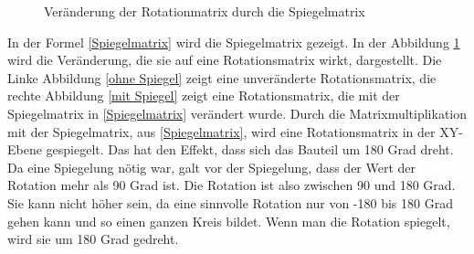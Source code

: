     \begin{figure}[t]
        \centering
            \caption[Veränderung der Rotationmatrix durch die Spiegelmatrix]{Veränderung der Rotationmatrix durch die Spiegelmatrix}
            \label{Veränderung der Rotationmatrix durch die Spiegelmatrix}
    \end{figure}

In der Formel \ref{Spiegelmatrix} wird die Spiegelmatrix gezeigt. In der Abbildung \ref{Veränderung der Rotationmatrix durch die Spiegelmatrix} wird die Veränderung, die sie auf eine Rotationsmatrix wirkt, dargestellt. 
Die Linke Abbildung \ref{ohne Spiegel} zeigt eine unveränderte Rotationsmatrix, die rechte Abbildung \ref{mit Spiegel} zeigt eine Rotationsmatrix, die mit der Spiegelmatrix in \ref{Spiegelmatrix} verändert wurde.
Durch die Matrixmultiplikation mit der Spiegelmatrix, aus \ref{Spiegelmatrix}, wird eine Rotationsmatrix in der XY-Ebene gespiegelt. Das hat den Effekt, dass sich das Bauteil um 180 Grad dreht. Da eine Spiegelung nötig war, galt vor der Spiegelung, dass der Wert der Rotation mehr als 90 Grad ist. 
Die Rotation ist also zwischen 90 und 180 Grad. Sie kann nicht höher sein, da eine sinnvolle Rotation nur von -180 bis 180 Grad gehen kann und so einen ganzen Kreis bildet. Wenn man die Rotation spiegelt, wird sie um 180 Grad gedreht.

